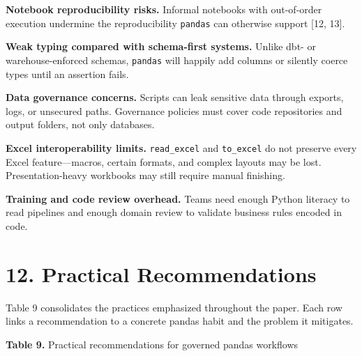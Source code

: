 \documentclass[
  12pt,
]{article}
\begin{document}
\textbf{Notebook reproducibility risks.} Informal notebooks with
out-of-order execution undermine the reproducibility \texttt{pandas} can
otherwise support {[}12, 13{]}.

\textbf{Weak typing compared with schema-first systems.} Unlike dbt- or
warehouse-enforced schemas, \texttt{pandas} will happily add columns or
silently coerce types until an assertion fails.

\textbf{Data governance concerns.} Scripts can leak sensitive data
through exports, logs, or unsecured paths. Governance policies must
cover code repositories and output folders, not only databases.

\textbf{Excel interoperability limits.} \texttt{read\_excel} and
\texttt{to\_excel} do not preserve every Excel feature---macros, certain
formats, and complex layouts may be lost. Presentation-heavy workbooks
may still require manual finishing.

\textbf{Training and code review overhead.} Teams need enough Python
literacy to read pipelines and enough domain review to validate business
rules encoded in code.

\section{12. Practical Recommendations}\label{practical-recommendations}

Table 9 consolidates the practices emphasized throughout the paper. Each
row links a recommendation to a concrete pandas habit and the problem it
mitigates.

\textbf{Table 9.} Practical recommendations for governed pandas
workflows
\end{document}

